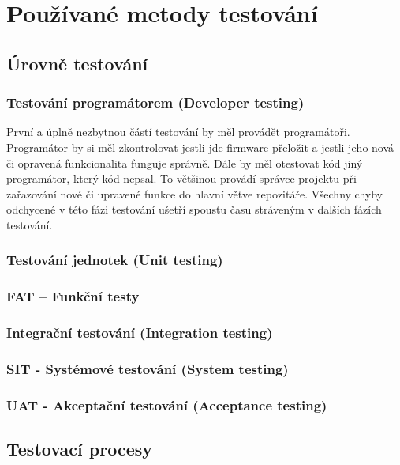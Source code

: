 \chapter{Používané metody testování}

\section{Úrovně testování}

\subsection{Testování programátorem (Developer testing)}
První a úplně nezbytnou částí testování by měl provádět programátoři. Programátor by si měl zkontrolovat jestli jde firmware přeložit a jestli jeho nová či opravená funkcionalita funguje správně. Dále by měl otestovat kód jiný programátor, který kód nepsal. To většinou provádí správce projektu při zařazování nové či upravené funkce do hlavní větve repozitáře. Všechny chyby odchycené v této fázi testování ušetří spoustu času stráveným v dalších fázích testování.


\subsection{Testování jednotek (Unit testing)}


\subsection{FAT – Funkční testy}


\subsection{Integrační testování (Integration testing)}


\subsection{SIT - Systémové testování (System testing)}


\subsection{UAT - Akceptační testování (Acceptance testing)}


\section{Testovací procesy}
